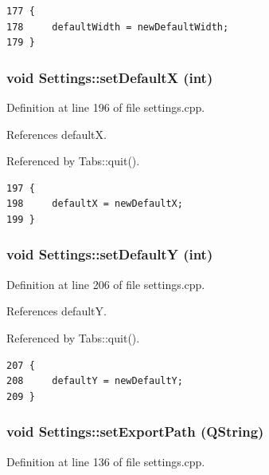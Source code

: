 \footnotesize\begin{verbatim}177 {
178     defaultWidth = newDefaultWidth;
179 }
\end{verbatim}\normalsize 


\hypertarget{classSettings_a16}{
\subsubsection[setDefaultX]{\setlength{\rightskip}{0pt plus 5cm}void Settings::set\-Default\-X (int)}}
\label{classSettings_a16}


Definition at line 196 of file settings.cpp.

References default\-X.

Referenced by Tabs::quit().

\footnotesize\begin{verbatim}197 {
198     defaultX = newDefaultX;
199 }
\end{verbatim}\normalsize 


\hypertarget{classSettings_a18}{
\subsubsection[setDefaultY]{\setlength{\rightskip}{0pt plus 5cm}void Settings::set\-Default\-Y (int)}}
\label{classSettings_a18}


Definition at line 206 of file settings.cpp.

References default\-Y.

Referenced by Tabs::quit().

\footnotesize\begin{verbatim}207 {
208     defaultY = newDefaultY;
209 }
\end{verbatim}\normalsize 


\hypertarget{classSettings_a4}{
\subsubsection[setExportPath]{\setlength{\rightskip}{0pt plus 5cm}void Settings::set\-Export\-Path (QString)}}
\label{classSettings_a4}


Definition at line 136 of file settings.cpp.

